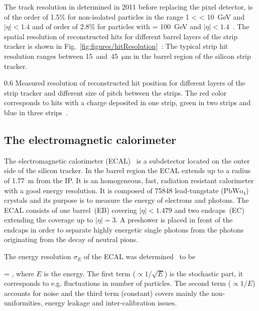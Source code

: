 The track  resolution in \pt determined in 2011 before replacing the pixel detector, is of the order of 1.5\% for non-isolated particles in the range 1 < \pt < 10~GeV and $|\eta| < 1.4$ and of order of 2.8\% for particles with \pt = 100~GeV and $|\eta| < 1.4$~\cite{TRK-11-001}. The spatial resolution of  reconstructed hits for different barrel layers of the strip tracker is shown in Fig.~\ref{fig:figures/hitResolution}~\cite{website:hitEff}: The typical strip hit resolution ranges between 15~and~45~$\mathrm{\mu m}$ in the barrel region of the silicon strip tracker.


                 {0.6}       
                 {Measured resolution of reconstructed hit position for different layers of the strip tracker and different size of pitch between the strips. The red color corresponds to hits with a charge deposited in one strip, green in two strips and blue in three strips~\cite{website:hitEff}. }

\subsection{The electromagnetic calorimeter}

The electromagnetic calorimeter (ECAL)~\cite{tdrECAL} is a subdetector located on the outer side of the silicon tracker. In the barrel region the ECAL extends up to a radius of 1.77~m from the IP. It is an homogeneous, fast, radiation resistant calorimeter with a good energy resolution. It is composed of 75848 lead-tungstate ($\mathrm{PbWo_{4}}$) crystals and its purpose is to measure the energy of electrons and photons. The ECAL consists of one barrel~(EB) covering $|\eta|<1.479$ and two endcaps~(EC) extending the coverage up to $|\eta| =3$. A preshower is placed in front of the endcaps in order to separate highly energetic single photons from the photons originating from the decay of neutral pions.

The energy resolution $\sigma_{E}$ of the ECAL was determined~\cite{Chatrchyan:2008aa} to be

{
  =  \bigoplus {}  ,
}
where $E$ is the energy. The first term ($\propto 1/\sqrt{E}$) is the stochastic part, it corresponds to e.g. fluctuations in number of particles. The second term ($\propto 1/E$) accounts for noise and the third term (constant) covers mainly the non-uniformities, energy leakage and inter-calibration issues.


